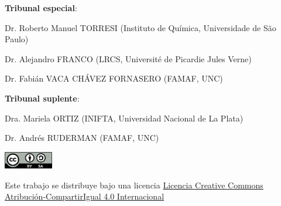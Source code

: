 \textbf{Tribunal especial}:

\hspace{1.5cm} Dr. Roberto Manuel TORRESI (Instituto de Química, Universidade de São Paulo)

\hspace{1.5cm} Dr. Alejandro FRANCO (LRCS, Université de Picardie Jules Verne)

\hspace{1.5cm} Dr. Fabián VACA CHÁVEZ FORNASERO (FAMAF, UNC)

\textbf{Tribunal suplente}:

\hspace{1.5cm} Dra. Mariela ORTIZ (INIFTA, Universidad Nacional de La Plata)

\hspace{1.5cm} Dr. Andrés RUDERMAN (FAMAF, UNC)

\vspace{1.0cm}

\begin{center}
    
    \vfill
    \href{https://creativecommons.org/licenses/by-sa/4.0/deed.es}{
        \includegraphics[height=0.75cm]{Caratula/cc-by-sa.png}
    }

    {\footnotesize 
    Este trabajo se distribuye bajo una licencia
    \href{https://creativecommons.org/licenses/by-sa/4.0/deed.es}{Licencia 
    Creative Commons Atribución-CompartirIgual 4.0 Internacional}
    }

\end{center}

\singlespacing
